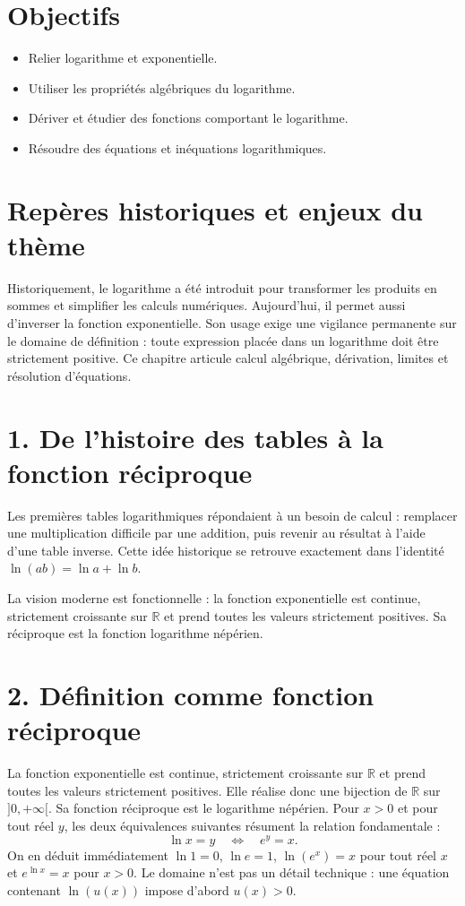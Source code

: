 
\section{Objectifs}
\begin{itemize}
\item Relier logarithme et exponentielle.
\item Utiliser les propriétés algébriques du logarithme.
\item Dériver et étudier des fonctions comportant le logarithme.
\item Résoudre des équations et inéquations logarithmiques.
\end{itemize}

\section{Repères historiques et enjeux du thème}
Historiquement, le logarithme a été introduit pour transformer les produits en sommes et simplifier les calculs numériques. Aujourd’hui, il permet aussi d’inverser la fonction exponentielle. Son usage exige une vigilance permanente sur le domaine de définition : toute expression placée dans un logarithme doit être strictement positive. Ce chapitre articule calcul algébrique, dérivation, limites et résolution d’équations.

\section{1. De l'histoire des tables à la fonction réciproque}
Les premières tables logarithmiques répondaient à un besoin de calcul : remplacer une multiplication difficile par une addition, puis revenir au résultat à l'aide d'une table inverse. Cette idée historique se retrouve exactement dans l'identité $\ln(ab)=\ln a+\ln b$.

La vision moderne est fonctionnelle : la fonction exponentielle est continue, strictement croissante sur $\mathbb{R}$ et prend toutes les valeurs strictement positives. Sa réciproque est la fonction logarithme népérien.

\section{2. Définition comme fonction réciproque}
La fonction exponentielle est continue, strictement croissante sur $\mathbb{R}$ et prend toutes les valeurs strictement positives. Elle réalise donc une bijection de $\mathbb{R}$ sur $]0,+\infty[$. Sa fonction réciproque est le logarithme népérien. Pour $x>0$ et pour tout réel $y$, les deux équivalences suivantes résument la relation fondamentale :
\[
\ln x=y\quad\Longleftrightarrow\quad e^y=x.
\]
On en déduit immédiatement $\ln 1=0$, $\ln e=1$, $\ln(e^x)=x$ pour tout réel $x$ et $e^{\ln x}=x$ pour $x>0$. Le domaine n’est pas un détail technique : une équation contenant $\ln(u(x))$ impose d’abord $u(x)>0$.

